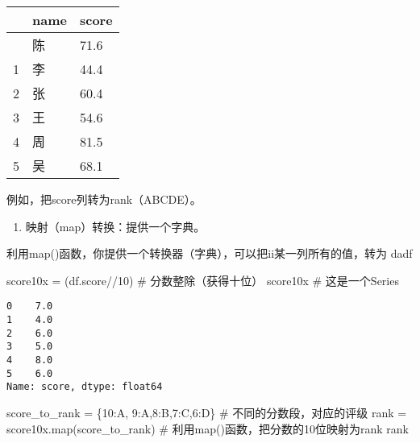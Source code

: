 \documentclass[
  letterpaper,
  DIV=11,
  numbers=noendperiod]{scrreprt}
\newenvironment{Shaded}{\begin{snugshade}}{\end{snugshade}}
\newcommand{\BuiltInTok}[1]{\textcolor[rgb]{0.00,0.23,0.31}{#1}}
\newcommand{\CommentTok}[1]{\textcolor[rgb]{0.37,0.37,0.37}{#1}}
\newcommand{\DecValTok}[1]{\textcolor[rgb]{0.68,0.00,0.00}{#1}}
\newcommand{\NormalTok}[1]{\textcolor[rgb]{0.00,0.23,0.31}{#1}}
\newcommand{\OperatorTok}[1]{\textcolor[rgb]{0.37,0.37,0.37}{#1}}
\newcommand{\StringTok}[1]{\textcolor[rgb]{0.13,0.47,0.30}{#1}}
\providecommand{\tightlist}{%
  \setlength{\itemsep}{0pt}\setlength{\parskip}{0pt}}\usepackage{longtable,booktabs,array}
\begin{document}
\begin{longtable}[]{@{}lll@{}}
\toprule\noalign{}
& name & score \\
\midrule\noalign{}
\endhead
\bottomrule\noalign{}
\endlastfoot
0 & 陈 & 71.6 \\
1 & 李 & 44.4 \\
2 & 张 & 60.4 \\
3 & 王 & 54.6 \\
4 & 周 & 81.5 \\
5 & 吴 & 68.1 \\
\end{longtable}

例如，把score列转为rank（ABCDE）。

\begin{enumerate}
\def\labelenumi{\arabic{enumi}.}
\tightlist
\item
  映射（map）转换：提供一个字典。
\end{enumerate}

利用map()函数，你提供一个转换器（字典），可以把ii某一列所有的值，转为
dadf

\begin{Shaded}
\begin{Highlighting}[]
\NormalTok{score10x }\OperatorTok{=}\NormalTok{ (df.score}\OperatorTok{//}\DecValTok{10}\NormalTok{) }\CommentTok{\# 分数整除（获得十位）}
\NormalTok{score10x }\CommentTok{\# 这是一个Series}
\end{Highlighting}
\end{Shaded}

\begin{verbatim}
0    7.0
1    4.0
2    6.0
3    5.0
4    8.0
5    6.0
Name: score, dtype: float64
\end{verbatim}

\begin{Shaded}
\begin{Highlighting}[]
\NormalTok{score\_to\_rank }\OperatorTok{=}\NormalTok{ \{}\DecValTok{10}\NormalTok{:}\StringTok{\textquotesingle{}A\textquotesingle{}}\NormalTok{, }\DecValTok{9}\NormalTok{:}\StringTok{\textquotesingle{}A\textquotesingle{}}\NormalTok{,}\DecValTok{8}\NormalTok{:}\StringTok{\textquotesingle{}B\textquotesingle{}}\NormalTok{,}\DecValTok{7}\NormalTok{:}\StringTok{\textquotesingle{}C\textquotesingle{}}\NormalTok{,}\DecValTok{6}\NormalTok{:}\StringTok{\textquotesingle{}D\textquotesingle{}}\NormalTok{\} }\CommentTok{\# 不同的分数段，对应的评级}
\NormalTok{rank }\OperatorTok{=}\NormalTok{ score10x.}\BuiltInTok{map}\NormalTok{(score\_to\_rank) }\CommentTok{\# 利用map()函数，把分数的10位映射为rank}
\NormalTok{rank}
\end{Highlighting}
\end{Shaded}
\end{document}
